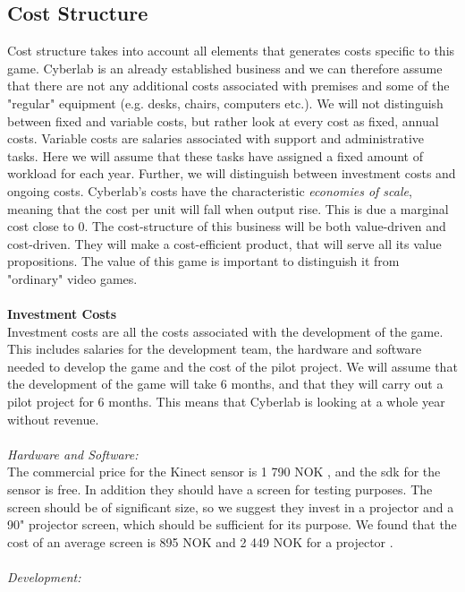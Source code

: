 \subsection{Cost Structure}
Cost structure takes into account all elements that generates costs specific to this game. Cyberlab is an already established business and we can therefore assume that there are not any additional costs associated with premises and some of the "regular" equipment (e.g. desks, chairs, computers etc.). We will not distinguish between fixed and variable costs, but rather look at every cost as fixed, annual costs. Variable costs are salaries associated with support and administrative tasks. Here we will assume that these tasks have assigned a fixed amount of workload for each year. Further, we will distinguish between investment costs and ongoing costs. Cyberlab's costs have the characteristic \emph{economies of scale}, meaning that the cost per unit will fall when output rise. This is due a marginal cost close to 0.  The cost-structure of this business will be both value-driven and cost-driven. They will make a cost-efficient product, that will serve all its value propositions. The value of this game is important to distinguish it from "ordinary" video games. \\ \\
\textbf{Investment Costs}\\
Investment costs are all the costs associated with the development of the game. This includes salaries for the development team, the hardware and software needed to develop the game and the cost of the pilot project. We will assume that the development of the game will take 6 months, and that they will carry out a pilot project for 6 months. This means that Cyberlab is looking at a whole year without revenue.\\ \\
\emph{Hardware and Software:}\\
The commercial price for the Kinect sensor is 1 790 NOK \cite{pricekinect}, and the \ac{sdk} for the sensor is free. In addition they should have a screen for testing purposes. The screen should be of significant size, so we suggest they invest in a projector and a 90" projector screen, which should be sufficient for its purpose. We found that the cost of an average screen is 895 NOK and 2 449 NOK for a projector \cite{priceprojector}\cite{pricescreen}.\\ \\
\emph{Development:}\\
